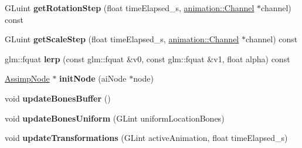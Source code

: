 \begin{DoxyCompactItemize}
\item 
\hypertarget{classfillwave_1_1manager_1_1BoneManager_a8b4ba76a8c61891aac1ce57660f563f1}{}G\+Luint {\bfseries get\+Rotation\+Step} (float time\+Elapsed\+\_\+s, \hyperlink{classfillwave_1_1animation_1_1Channel}{animation\+::\+Channel} $\ast$channel) const \label{classfillwave_1_1manager_1_1BoneManager_a8b4ba76a8c61891aac1ce57660f563f1}

\item 
\hypertarget{classfillwave_1_1manager_1_1BoneManager_aeff83b75b1d1b2ca9487c9602159e7fb}{}G\+Luint {\bfseries get\+Scale\+Step} (float time\+Elapsed\+\_\+s, \hyperlink{classfillwave_1_1animation_1_1Channel}{animation\+::\+Channel} $\ast$channel) const \label{classfillwave_1_1manager_1_1BoneManager_aeff83b75b1d1b2ca9487c9602159e7fb}

\item 
\hypertarget{classfillwave_1_1manager_1_1BoneManager_ae77bb2d366053efc06a187da4950ed5b}{}glm\+::fquat {\bfseries lerp} (const glm\+::fquat \&v0, const glm\+::fquat \&v1, float alpha) const \label{classfillwave_1_1manager_1_1BoneManager_ae77bb2d366053efc06a187da4950ed5b}

\item 
\hypertarget{classfillwave_1_1manager_1_1BoneManager_a6286be8c76b9244ad1edfd866fb31c5f}{}\hyperlink{classfillwave_1_1manager_1_1AssimpNode}{Assimp\+Node} $\ast$ {\bfseries init\+Node} (ai\+Node $\ast$node)\label{classfillwave_1_1manager_1_1BoneManager_a6286be8c76b9244ad1edfd866fb31c5f}

\item 
\hypertarget{classfillwave_1_1manager_1_1BoneManager_a09eff893aab25b8407251429768363c9}{}void {\bfseries update\+Bones\+Buffer} ()\label{classfillwave_1_1manager_1_1BoneManager_a09eff893aab25b8407251429768363c9}

\item 
\hypertarget{classfillwave_1_1manager_1_1BoneManager_a996a798fc2e1f7e6b6eb18ebfdde6195}{}void {\bfseries update\+Bones\+Uniform} (G\+Lint uniform\+Location\+Bones)\label{classfillwave_1_1manager_1_1BoneManager_a996a798fc2e1f7e6b6eb18ebfdde6195}

\item 
\hypertarget{classfillwave_1_1manager_1_1BoneManager_a55f6856fa921771978b7f8c4001eeba3}{}void {\bfseries update\+Transformations} (G\+Lint active\+Animation, float time\+Elapsed\+\_\+s)\label{classfillwave_1_1manager_1_1BoneManager_a55f6856fa921771978b7f8c4001eeba3}

\end{DoxyCompactItemize}
